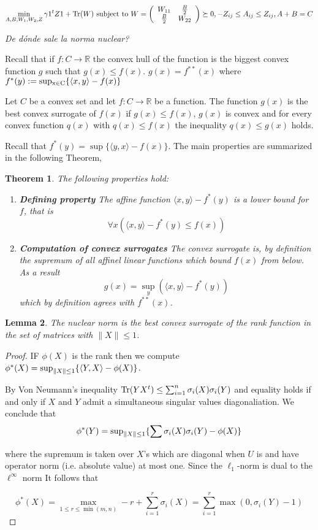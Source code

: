 \documentclass[12pt]{amsart}
\newtheorem{lemma}{Lemma}[section]
\newtheorem{theorem}[lemma]{Theorem}
\numberwithin{equation}{section}
\newcommand{\RR}{\mathbb{R}}
\begin{document}
\[\min_{A,B,W_1,W_2,Z} \gamma 1^tZ1+{\rm Tr}(W)\\
\text{ subject to }W=\left(
\begin{array}{cc}
W_{11} & \frac{B}{2}\\
\frac{B}{2} & W_{22}\\
\end{array}
\right)\succeq 0,
-Z_{ij}\leq A_{ij}\leq Z_{ij},
A+B=C
\]


{\it De d\'onde sale la norma nuclear?}

Recall that if $f:C\rightarrow \RR$ the convex hull of the function is the biggest convex function $g$ such that $g(x)\leq f(x)$. $g(x)=f^{**}(x)$ where $f^*(y):={\rm sup_{x\in C}}\{\langle x,y\rangle -f(x)\}$

Let $C$ be a convex set and let $f:C\rightarrow \RR$ be a function. The function $g(x)$ is the best convex surrogate of $f(x)$ if $g(x)\leq f(x)$, $g(x)$ is convex and for every convex function $q(x)$ with $q(x)\leq f(x)$ the inequality $q(x)\leq g(x)$ holds.

Recall that $f^*(y)=\sup\{\langle y,x\rangle -f(x)\}$. The main properties are summarized in the following Theorem,

\begin{theorem} The following properties hold:
\begin{enumerate}
\item {\bf Defining property} The affine function $\langle x,y\rangle-f^*(y)$ is a lower bound for $f$, that is
\[\forall x\left(\langle x,y\rangle-f^*(y)\leq f(x) \right)\] 
\item {\bf Computation of convex surrogates} The convex surrogate is, by definition the supremum of all affinel linear functions which bound $f(x)$ from below. As a result
\[g(x)=\sup_{y}\left(\langle x,y\rangle -f^*(y)\right)\]
which by definition agrees with $f^{**}(x)$.
\end{enumerate}
\end{theorem}



\begin{lemma} The nuclear norm is the best convex surrogate of the rank function in the set of matrices with $\|X\|\leq 1$.
\end{lemma}
\begin{proof} IF $\phi(X)$ is the rank then we compute
$\phi^*(X)={\rm sup}_{\|X\|\leq 1} \{\langle Y,X\rangle -\phi(X)\}$.

By Von Neumann's inequality ${\rm Tr}(YX^t)\leq \sum_{i=1}^ n \sigma_i(X)\sigma_i(Y)$ and equality holds if and only if $X$ and $Y$ admit a simultaneous singular values diagonaliation. We conclude that
\[\phi^*(Y)={\rm sup}_{\|X\|\leq 1} \{\sum \sigma_i(X)\sigma_i(Y)-\phi(X)\}\]

where the supremum is taken over $X$'s which are diagonal when $U$ is and have operator norm (i.e. absolute value) at most one. Since the $\ell_1$-norm is dual to the $\ell^{\infty}$ norm It follows that

\[\phi^*(X)=\max_{1\leq r\leq \min(m,n)}-r+\sum_{i=1}^r\sigma_i(X)=\sum_{i=1}^r\max(0, \sigma_i(Y)-1)\]

 

\end{proof}
\end{document}
